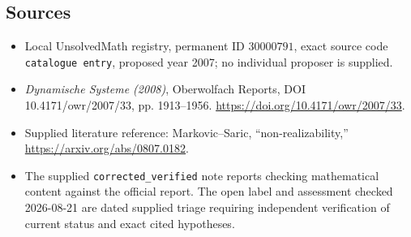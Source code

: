 \documentclass[11pt]{article}
\begin{document}
\subsection{Sources}
\begin{itemize}
\item Local UnsolvedMath registry, permanent ID \(30000791\), exact source code \texttt{catalogue entry}, proposed year 2007; no individual proposer is supplied.
\item \emph{Dynamische Systeme (2008)}, Oberwolfach Reports, DOI 10.4171/owr/2007/33, pp. 1913--1956. \url{https://doi.org/10.4171/owr/2007/33}.
\item Supplied literature reference: Markovic--Saric, ``non-realizability,'' \url{https://arxiv.org/abs/0807.0182}.
\item The supplied \texttt{corrected\_verified} note reports checking mathematical content against the official report. The open label and assessment checked 2026-08-21 are dated supplied triage requiring independent verification of current status and exact cited hypotheses.
\end{itemize}
\end{document}

